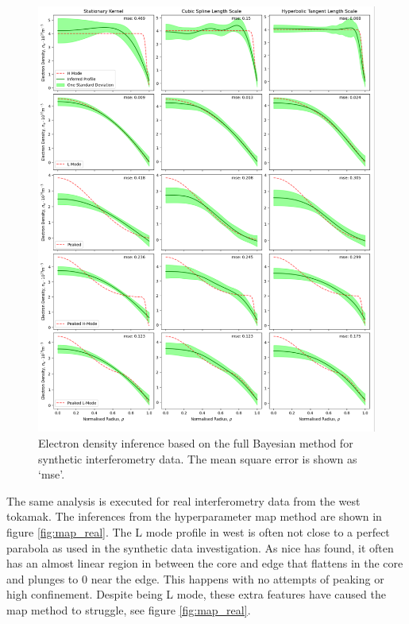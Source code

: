 \begin{figure}[H]
    \centering
    \includegraphics[width=\textwidth]{images/Final/FBsynthetic_all.png}
    \caption{Electron density inference based on the full Bayesian method for synthetic interferometry data. The mean square error is shown as `mse'.}
    \label{fig:fbsynthetic}
\end{figure}
\restoregeometry 


The same analysis is executed for real interferometry data from the \gls{west} tokamak. The inferences from the hyperparameter \gls{map} method are shown in figure \ref{fig:map_real}. The L mode profile in \gls{west} is often not close to a perfect parabola as used in the synthetic data investigation. As \gls{nice} has found, it often has an almost linear region in between the core and edge that flattens in the core and plunges to 0 near the edge. This happens with no attempts of peaking or high confinement. Despite being L mode, these extra features have caused the \gls{map} method to struggle, see figure \ref{fig:map_real}. 

